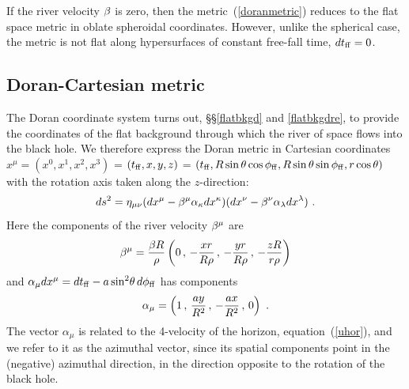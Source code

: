\documentclass[twocolumn,showpacs,preprintnumbers,amsmath,amssymb,prb]{revtex4}
\begin{document}
If the river velocity $\beta$ is zero,
then the metric~(\ref{doranmetric}) reduces to the flat space metric
in oblate spheroidal coordinates.
However, unlike the spherical case,
the metric is not flat along hypersurfaces of constant free-fall time,
$d t_{\rm ff} = 0$.

\subsection{Doran-Cartesian metric}
\label{dorancartesian}

The Doran coordinate system turns out, \S\S\ref{flatbkgd} and \ref{flatbkgdre},
to provide the coordinates of the flat background
through which the river of space
flows into the black hole.
We therefore express the Doran metric in Cartesian coordinates
$x^\mu = (x^0,x^1,x^2,x^3)$
=
$(t_{\rm ff},x,y,z)$
=
$(t_{\rm ff}, R \sin\theta\cos\phi_{\rm ff}, R \sin\theta\sin\phi_{\rm ff}, r \cos\theta)$
with the rotation axis taken along the $z$-direction:
\begin{equation}
\label{dorancartesianmetric}
  d s^2
  =
  \eta_{\mu\nu}
  ( d x^\mu - \beta^\mu \alpha_\kappa d x^\kappa )
  ( d x^\nu - \beta^\nu \alpha_\lambda d x^\lambda )
  \ .
\end{equation}
Here the components of the river velocity $\beta^\mu$ are
\begin{equation}
\label{vmu}
  \beta^\mu
  = {\beta R \over \rho} \left(
    0 \, , \, - {x r \over R \rho} \, , \, - {y r \over R \rho} \, ,
    \, - {z R \over r \rho}
  \right)
\end{equation}
and
$\alpha_\mu d x^\mu = d t_{\rm ff} - a \sin^2\!\theta \, d\phi_{\rm ff}$
has components
\begin{equation}
\label{amu}
  \alpha_\mu
  =
  \left( 1 \, , \, {a y \over R^2} \, , \, - {a x \over R^2} \, , \, 0 \right)
  \ .
\end{equation}
The vector $\alpha_\mu$ is related to the 4-velocity of the horizon,
equation~(\ref{uhor}),
and we refer to it as
the azimuthal vector,
since its spatial components point in the (negative) azimuthal direction,
in the direction opposite to the rotation of the black hole.
\end{document}
